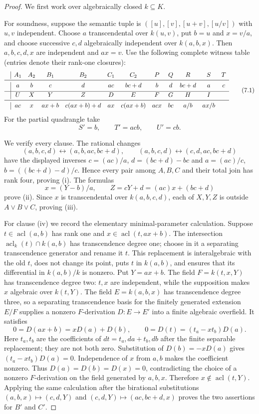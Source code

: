 \documentclass[11pt,oneside]{article}
\theoremstyle{definition}
\theoremstyle{remark}
\newcommand{\acl}{\operatorname{acl}}
\begin{document}
\begin{proof}
We first work over algebraically closed $k\subseteq K$.

For soundness, suppose the semantic tuple is
$([u],[v],[u+v],[u/v])$ with $u,v$ independent.  Choose $a$ transcendental over
$k(u,v)$, put $b=u$ and $x=v/a$, and choose successive $c,d$ algebraically independent
over $k(a,b,x)$.  Then $a,b,c,d,x$ are independent and $ax=v$.  Use the following
complete witness table (entries denote their rank-one closures):
\[
\begin{array}{c|ccccccccccc}
 &A_1&A_2&B_1&B_2&C_1&C_2&P&Q&R&S&T\\ \midrule
 &a&b&c&d&ac&bc+d&b&d&bc+d&a&c\\[1mm]
\hline
 &U&X&Y&Z&D&E&F&G&H&I\\ \midrule
 &ac&x&ax+b&c(ax+b)+d&ax&c(ax+b)&acx&bc&a/b&ax/b
\end{array}                                                     \tag{7.1}
\]
For the partial quadrangle take
\[
 S'=b,\qquad T'=acb,\qquad U'=cb.                              \tag{7.2}
\]

We verify every clause.  The rational changes
\[
 (a,b,c,d)\longleftrightarrow(a,b,ac,bc+d),\qquad
 (a,b,c,d)\longleftrightarrow(c,d,ac,bc+d)
\]
have the displayed inverses $c=(ac)/a$, $d=(bc+d)-bc$ and
$a=(ac)/c$, $b=((bc+d)-d)/c$.  Hence every pair among $A,B,C$ and their total join has
rank four, proving (i).  The formulas
\[
 x=(Y-b)/a,\qquad Z=cY+d=(ac)x+(bc+d)
\]
prove (ii).  Since $x$ is transcendental over $k(a,b,c,d)$, each of $X,Y,Z$ is outside
$A\vee B\vee C$, proving (iii).

For clause (iv) we record the elementary minimal-parameter calculation.  Suppose
$t\in\acl(a,b)$ has rank one and $x\in\acl(t,ax+b)$.  The intersection
$\acl_k(t)\cap k(a,b)$ has transcendence degree one; choose in it a separating
transcendence generator and rename it $t$.  This replacement is interalgebraic with the
old $t$, does not change its point, puts $t$ in $k(a,b)$, and ensures that its
differential in $k(a,b)/k$ is nonzero.  Put $Y=ax+b$.  The field
$F=k(t,x,Y)$ has transcendence degree two: $t,x$ are independent, while the supposition
makes $x$ algebraic over $k(t,Y)$.  The field $E=k(a,b,x)$ has transcendence degree
three, so a separating transcendence basis for the finitely generated extension $E/F$
supplies a nonzero $F$-derivation $D:E\to E'$ into a finite algebraic overfield.  It
satisfies
\[
 0=D(ax+b)=xD(a)+D(b),\qquad
 0=D(t)=(t_a-xt_b)D(a).
\]
Here $t_a,t_b$ are the coefficients of $dt=t_a,da+t_b,db$ after the finite separable
replacement; they are not both zero.  Substitution of $D(b)=-xD(a)$ gives
$(t_a-xt_b)D(a)=0$.  Independence of $x$ from $a,b$ makes the coefficient nonzero.
Thus $D(a)=D(b)=D(x)=0$, contradicting the choice of a nonzero $F$-derivation on the
field generated by $a,b,x$.  Therefore
$x\notin\acl(t,Y)$.  Applying the same calculation after the birational substitutions
$(a,b,x)\mapsto(c,d,Y)$ and $(c,d,Y)\mapsto(ac,bc+d,x)$ proves the two assertions for
$B'$ and $C'$.


\end{proof}
\end{document}
